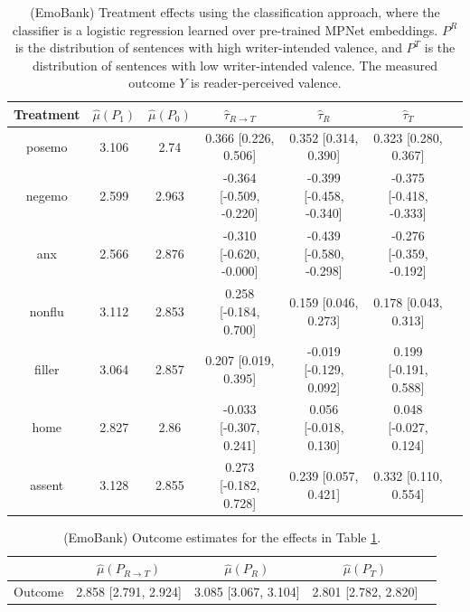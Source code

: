 \documentclass{article}
\begin{document}
\begin{table}[!ht]
\centering
\begin{tabular}{c|cccccc}
\toprule
    Treatment   &   $\hat{\mu}(P_1)$ &   $\hat{\mu}(P_0)$ & $\hat{\tau}_{R \rightarrow T}$   & $\hat{\tau}_R$          & $\hat{\tau}_T$          \\
\midrule
    posemo      &              3.106 &              2.74  & 0.366 [0.226, 0.506]             & 0.352 [0.314, 0.390]    & 0.323 [0.280, 0.367]    \\
    negemo      &              2.599 &              2.963 & -0.364 [-0.509, -0.220]          & -0.399 [-0.458, -0.340] & -0.375 [-0.418, -0.333] \\
    anx         &              2.566 &              2.876 & -0.310 [-0.620, -0.000]          & -0.439 [-0.580, -0.298] & -0.276 [-0.359, -0.192] \\
    nonflu      &              3.112 &              2.853 & 0.258 [-0.184, 0.700]            & 0.159 [0.046, 0.273]    & 0.178 [0.043, 0.313]    \\
    filler      &              3.064 &              2.857 & 0.207 [0.019, 0.395]             & -0.019 [-0.129, 0.092]  & 0.199 [-0.191, 0.588]   \\
    home        &              2.827 &              2.86  & -0.033 [-0.307, 0.241]           & 0.056 [-0.018, 0.130]   & 0.048 [-0.027, 0.124]   \\
    assent      &              3.128 &              2.855 & 0.273 [-0.182, 0.728]            & 0.239 [0.057, 0.421]    & 0.332 [0.110, 0.554]    \\
\bottomrule
\end{tabular}
\caption{(EmoBank) Treatment effects using the classification approach, where the classifier is a logistic regression learned over pre-trained MPNet embeddings. $P^R$ is the distribution of sentences with high writer-intended valence, and $P^T$ is the distribution of sentences with low writer-intended valence. The measured outcome $Y$ is reader-perceived valence.}
\label{tab:results_clf_mpnet_emobank}
\end{table}

\begin{table}[!ht]
\centering
\begin{tabular}{c|cccc}
\toprule
    & $\hat{\mu}(P_{R \rightarrow T})$   & $\hat{\mu}(P_R)$     & $\hat{\mu}(P_T)$     \\
\midrule
    Outcome & 2.858 [2.791, 2.924]               & 3.085 [3.067, 3.104] & 2.801 [2.782, 2.820] \\
\bottomrule
\end{tabular}
\caption{(EmoBank) Outcome estimates for the effects in Table \ref{tab:results_clf_mpnet_emobank}.}
\label{tab:results_clf_mpnet_emobank_outcome}
\end{table}
\end{document}
